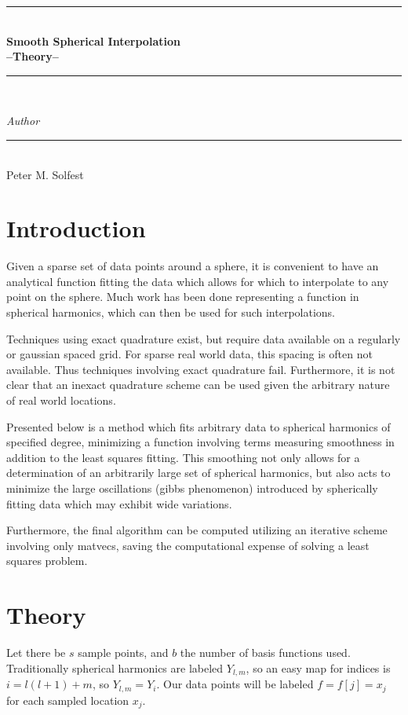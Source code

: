 \documentclass[12pt,a4paper]{article}
\begin{document}
\thispagestyle{empty}
\begin{center}
\rule{\textwidth}{.5mm} \\[0.8cm]
{\huge \bfseries Smooth Spherical Interpolation\\ --Theory--}\\[.4cm]
\rule{\textwidth}{.5mm} \\[1.5cm]

{\Large \textsl{Author}\\[-.6cm]\rule{60pt}{.2mm} \\[.4cm] Peter M. Solfest}
\newpage
\end{center}
\section{Introduction}
Given a sparse set of data points around a sphere,
it is convenient to have an analytical function fitting
the data which allows for which to interpolate to any point on the sphere.
Much work has been done representing a function in spherical harmonics,
which can then be used for such interpolations.

Techniques using exact quadrature exist, but
require data available on a regularly or gaussian spaced grid.
For sparse real world data, this spacing is often not available.
Thus techniques involving exact quadrature fail.
Furthermore, it is not clear that an inexact quadrature scheme can
be used given the arbitrary nature of real world locations.

Presented below is a method which fits arbitrary data to
spherical harmonics of specified degree, minimizing a function
involving terms measuring smoothness in addition to the least
squares fitting.
This smoothing not only allows for a determination of an
arbitrarily large set of spherical harmonics, but also acts
to minimize the large oscillations (gibbs phenomenon) introduced
by spherically fitting data which may exhibit wide variations.

Furthermore, the final algorithm can be computed
utilizing an iterative scheme involving only matvecs, saving
the computational expense of solving a least squares problem.

\section{Theory}
Let there be $s$ sample points, and $b$ the number of basis functions used.
Traditionally spherical harmonics are labeled $Y_{l,m}$, so an easy map for
indices is $i = l (l+1) + m$, so $Y_{l,m} = Y_i$.
Our data points will be labeled $f = f[j] = x_j$ for each sampled location $x_j$.
\end{document}
